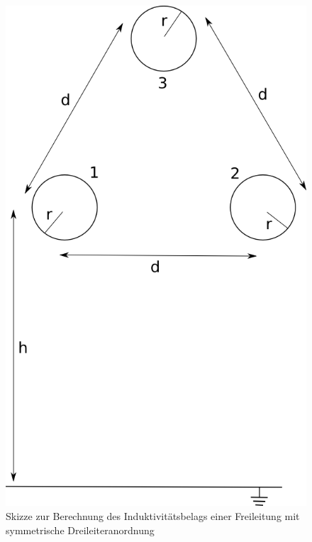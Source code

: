 \begin{figure}[bthn]
\begin{center}
\noindent
\includegraphics[scale=0.3]{leitungsreaktanz.png}
\end{center}
\caption{Skizze zur Berechnung des Induktivitätsbelags einer Freileitung mit symmetrische Dreileiteranordnung} 
\label{pic:leitungsreaktanz} 
\end{figure}

